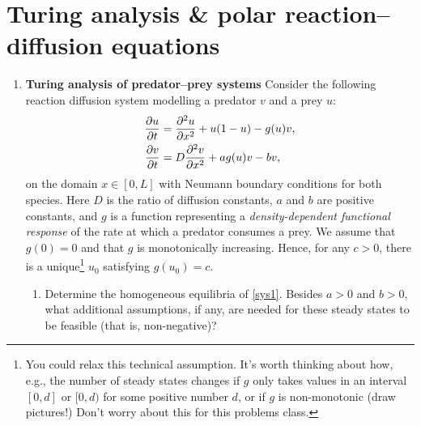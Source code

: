 \documentclass[a4paper,12pt]{article}
\begin{document}
 
%
\newcommand{\sol}[1]{}
\renewcommand*{\thefootnote}{\arabic{footnote}}

\section*{Turing analysis \& polar reaction--diffusion equations}
    
    \begin{enumerate}
\item{
\textbf{Turing analysis of predator--prey systems} \quad 
Consider the following reaction diffusion system modelling a predator $v$ and a prey $u$:
\begin{equation}
\label{sys1}
\begin{aligned}
\pd{u}{t}  &= \pdd{u}{x} + u(1-u)-g(u)v,\\
\pd{v}{t}  &= D\pdd{v}{x} + ag(u)v-bv,
\end{aligned}
\end{equation}
on the domain $x \in [0,L]$ with Neumann boundary conditions for both species. Here $D$ is the ratio of diffusion constants, $a$ and $b$ are positive constants, and $g$ is a function representing a \emph{density-dependent functional response} of the rate at which a predator consumes a prey. We assume that $g(0)=0$ and that $g$ is monotonically increasing. Hence, for any $c>0$, there is a unique\footnote{You could relax this technical assumption. It's worth thinking about how, e.g., the number of steady states changes if $g$ only takes values in an interval $[0,d]$ or $[0,d)$ for some positive number $d$, or if $g$ is non-monotonic (draw pictures!) Don't worry about this for this problems class. } $u_0$ satisfying $g(u_0)=c$.
\begin{enumerate}
\item{Determine the homogeneous equilibria of \eqref{sys1}. Besides $a>0$ and $b>0$, what additional assumptions, if any, are needed for these steady states to be feasible (that is, non-negative)?
\sol{There are two predator-free equilibria given by $(u_0,v_0)=(0,0),(1,0)$. Using the assumption on $g$, we know that there is a unique $u_0$ such that $g(u_0)=b/a$. We then have by the first equation that $v_0 = au_0(1-u_0)/b$. We have that $u_0>0$ by assumptions on $g$, but we require that $u_0 \in (0,1]$ for $v_0$ to be feasible. We can also spot that if $u_0=1$, $v_0=0$ which is a different equilibrium, so to have three distinct equilibria we need $u_0 \in (0,1)$.}
}
\end{enumerate}}
\end{enumerate}
\end{document}
